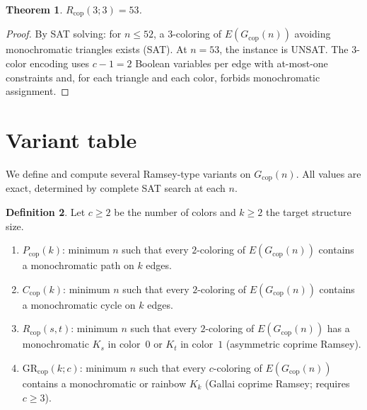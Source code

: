 \documentclass[11pt]{article}
\theoremstyle{plain}
\newtheorem{theorem}{Theorem}[section]
\theoremstyle{definition}
\newtheorem{definition}[theorem]{Definition}
\newcommand{\Rcop}{R_{\mathrm{cop}}}
\newcommand{\Pcop}{P_{\mathrm{cop}}}
\newcommand{\Ccop}{C_{\mathrm{cop}}}
\newcommand{\GRcop}{\mathrm{GR}_{\mathrm{cop}}}
\newcommand{\Gcop}{G_{\mathrm{cop}}}
\begin{document}
\begin{theorem}\label{thm:rcop33}
$\Rcop(3;3)=53$.
\end{theorem}

\begin{proof}
By SAT solving: for $n\le 52$, a $3$-coloring of $E(\Gcop(n))$
avoiding monochromatic triangles exists (SAT). At $n=53$, the instance
is UNSAT. The $3$-color encoding uses $c-1=2$ Boolean variables per edge
with at-most-one constraints and, for each triangle and each color,
forbids monochromatic assignment.
\end{proof}

\section{Variant table}\label{sec:variants}

We define and compute several Ramsey-type variants on $\Gcop(n)$. All
values are exact, determined by complete SAT search at each $n$.

\begin{definition}\label{def:variants}
Let $c\ge 2$ be the number of colors and $k\ge 2$ the target structure
size.
\begin{enumerate}
\item $\Pcop(k)$: minimum $n$ such that every $2$-coloring of
  $E(\Gcop(n))$ contains a monochromatic path on $k$ edges.
\item $\Ccop(k)$: minimum $n$ such that every $2$-coloring of
  $E(\Gcop(n))$ contains a monochromatic cycle on $k$ edges.
\item $\Rcop(s,t)$: minimum $n$ such that every $2$-coloring of
  $E(\Gcop(n))$ has a monochromatic $K_s$ in color~$0$ or $K_t$ in
  color~$1$ (asymmetric coprime Ramsey).
\item $\GRcop(k;c)$: minimum $n$ such that every $c$-coloring of
  $E(\Gcop(n))$ contains a monochromatic or rainbow $K_k$ (Gallai
  coprime Ramsey; requires $c\ge 3$).
\end{enumerate}
\end{definition}
\end{document}
